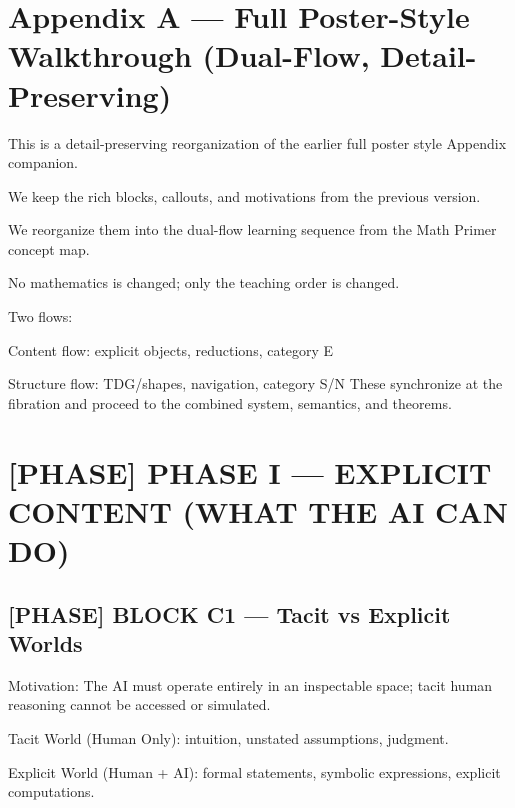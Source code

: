 
\section*{Appendix A --- Full Poster-Style Walkthrough (Dual-Flow, Detail-Preserving)}

This is a detail-preserving reorganization of the earlier full poster style Appendix companion.\par

We keep the rich blocks, callouts, and motivations from the previous version.\par

We reorganize them into the dual-flow learning sequence from the Math Primer concept map.\par

No mathematics is changed; only the teaching order is changed.\par

Two flows:\par

Content flow: explicit objects, reductions, category E\par

Structure flow: TDG/shapes, navigation, category S/N These synchronize at the fibration and proceed to the combined system, semantics, and theorems.\par

\section*{[PHASE] PHASE I --- EXPLICIT CONTENT (WHAT THE AI CAN DO)}

\subsection*{[PHASE] BLOCK C1 --- Tacit vs Explicit Worlds}

Motivation: The AI must operate entirely in an inspectable space; tacit human reasoning cannot be accessed or simulated.\par

Tacit World (Human Only): intuition, unstated assumptions, judgment.\par

Explicit World (Human + AI): formal statements, symbolic expressions, explicit computations.\par

